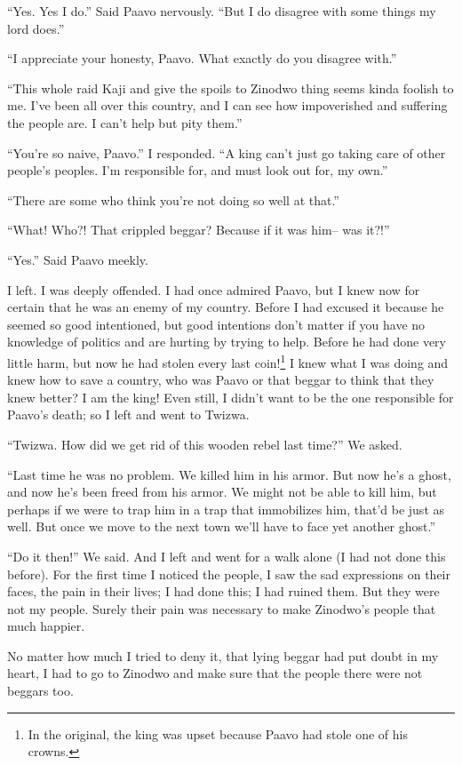 ``Yes. Yes I do.'' Said Paa\-vo nervously. ``But I do disagree with some things my lord does.''

``I appreciate your honesty, Paa\-vo. What exactly do you disagree with.''

``This whole raid Ka\-ji and give the spoils to Zi\-no\-dwo thing seems kinda foolish to me. I've been all over this country, and I can see how impoverished and suffering the people are. I can't help but pity them.''

``You're so naive, Paa\-vo.'' I responded. ``A king can't just go taking care of other people's peoples. I'm responsible for, and must look out for, my own.''

``There are some who think you're not doing so well at that.''

``What! Who?! That crippled beggar? Because if it was him-- was it?!''

``Yes.'' Said Paa\-vo meekly.

I left. I was deeply offended. I had once admired Paa\-vo, but I knew now for certain that he was an enemy of my country. Before I had excused it because he seemed so good intentioned, but good intentions don't matter if you have no knowledge of politics and are hurting by trying to help. Before he had done very little harm, but now he had stolen every last coin!\footnote{In the original, the king was upset because Paa\-vo had stole one of his crowns.} I knew what I was doing and knew how to save a country, who was Paa\-vo or that beggar to think that they knew better? I am the king! Even still, I didn't want to be the one responsible for Paa\-vo's death; so I left and went to Twi\-zwa.

``Twi\-zwa. How did we get rid of this wooden rebel last time?'' We asked.

``Last time he was no problem. We killed him in his armor. But now he's a ghost, and now he's been freed from his armor. We might not be able to kill him, but perhaps if we were to trap him in a trap that immobilizes him, that'd be just as well. But once we move to the next town we'll have to face yet another ghost.''

``Do it then!'' We said. And I left and went for a walk alone (I had not done this before). For the first time I noticed the people, I saw the sad expressions on their faces, the pain in their lives; I had done this; I had ruined them. But they were not my people. Surely their pain was necessary to make Zi\-no\-dwo's people that much happier.

No matter how much I tried to deny it, that lying beggar had put doubt in my heart, I had to go to Zi\-no\-dwo and make sure that the people there were not beggars too.
